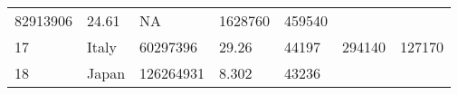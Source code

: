 \documentclass[
]{article}
\begin{document}
\begin{longtable}[]{@{}lllllll@{}}
\begin{minipage}[t]{0.13\columnwidth}
82913906\strut
\end{minipage} & \begin{minipage}[t]{0.13\columnwidth}\raggedright
24.61\strut
\end{minipage} & \begin{minipage}[t]{0.09\columnwidth}\raggedright
NA\strut
\end{minipage} & \begin{minipage}[t]{0.12\columnwidth}\raggedright
1628760\strut
\end{minipage} & \begin{minipage}[t]{0.12\columnwidth}\raggedright
459540\strut
\end{minipage}\tabularnewline
\begin{minipage}[t]{0.06\columnwidth}\raggedright
17\strut
\end{minipage} & \begin{minipage}[t]{0.15\columnwidth}\raggedright
Italy\strut
\end{minipage} & \begin{minipage}[t]{0.13\columnwidth}\raggedright
60297396\strut
\end{minipage} & \begin{minipage}[t]{0.13\columnwidth}\raggedright
29.26\strut
\end{minipage} & \begin{minipage}[t]{0.09\columnwidth}\raggedright
44197\strut
\end{minipage} & \begin{minipage}[t]{0.12\columnwidth}\raggedright
294140\strut
\end{minipage} & \begin{minipage}[t]{0.12\columnwidth}\raggedright
127170\strut
\end{minipage}\tabularnewline
\begin{minipage}[t]{0.06\columnwidth}\raggedright
18\strut
\end{minipage} & \begin{minipage}[t]{0.15\columnwidth}\raggedright
Japan\strut
\end{minipage} & \begin{minipage}[t]{0.13\columnwidth}\raggedright
126264931\strut
\end{minipage} & \begin{minipage}[t]{0.13\columnwidth}\raggedright
8.302\strut
\end{minipage} & \begin{minipage}[t]{0.09\columnwidth}\raggedright
43236\strut
\end{minipage} & \begin{minipage}[t]{0.12\columnwidth}\raggedright

\end{minipage}
\end{longtable}
\end{document}

